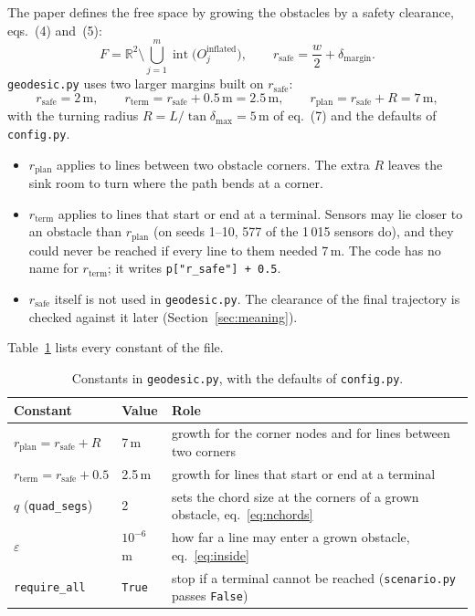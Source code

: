 \documentclass[10pt]{article}
\newcommand{\code}[1]{\texttt{#1}}
\newcommand{\rplan}{r_{\mathrm{plan}}}
\newcommand{\rsafe}{r_{\mathrm{safe}}}
\newcommand{\rterm}{r_{\mathrm{term}}}
\newcommand{\R}{\mathbb{R}}
\begin{document}
The paper defines the free space by growing the obstacles by a safety clearance, eqs.~(4) and~(5):
\begin{equation}
  F = \R^2 \setminus \bigcup_{j=1}^{m} \operatorname{int}\bigl(O_j^{\mathrm{inflated}}\bigr), \qquad
  \rsafe = \frac{w}{2} + \delta_{\mathrm{margin}}.
  \label{eq:free}
\end{equation}
\code{geodesic.py} uses two larger margins built on $\rsafe$:
\begin{equation}
  \rsafe = 2\,\mathrm{m}, \qquad
  \rterm = \rsafe + 0.5\,\mathrm{m} = 2.5\,\mathrm{m}, \qquad
  \rplan = \rsafe + R = 7\,\mathrm{m},
  \label{eq:margins}
\end{equation}
with the turning radius $R = L / \tan\delta_{\max} = 5$\,m of eq.~(7) and the defaults of \code{config.py}.
\begin{itemize}[leftmargin=2em, itemsep=2pt]
  \item $\rplan$ applies to lines between two obstacle corners. The extra $R$ leaves the sink room to turn where the path
        bends at a corner.
  \item $\rterm$ applies to lines that start or end at a terminal. Sensors may lie closer to an obstacle than $\rplan$ (on
        seeds 1--10, 577 of the 1\,015 sensors do), and they could never be reached if every line to them needed 7\,m.
        The code has no name for $\rterm$; it writes \code{p["r\_safe"] + 0.5}.
  \item $\rsafe$ itself is not used in \code{geodesic.py}. The clearance of the final trajectory is checked against it
        later (Section~\ref{sec:meaning}).
\end{itemize}
Table~\ref{tab:constants} lists every constant of the file.

\begin{table}[h]
\centering
\small
\caption{Constants in \code{geodesic.py}, with the defaults of \code{config.py}.}
\label{tab:constants}
\begin{tabularx}{\textwidth}{@{}l l >{\raggedright\arraybackslash}X@{}}
\toprule
Constant & Value & Role \\
\midrule
$\rplan = \rsafe + R$ & 7\,m & growth for the corner nodes and for lines between two corners \\
$\rterm = \rsafe + 0.5$ & 2.5\,m & growth for lines that start or end at a terminal \\
$q$ (\code{quad\_segs}) & 2 & sets the chord size at the corners of a grown obstacle, eq.~\eqref{eq:nchords} \\
$\varepsilon$ & $10^{-6}$\,m & how far a line may enter a grown obstacle, eq.~\eqref{eq:inside} \\
\code{require\_all} & \code{True} & stop if a terminal cannot be reached (\code{scenario.py} passes \code{False}) \\
\bottomrule
\end{tabularx}
\end{table}
\end{document}
